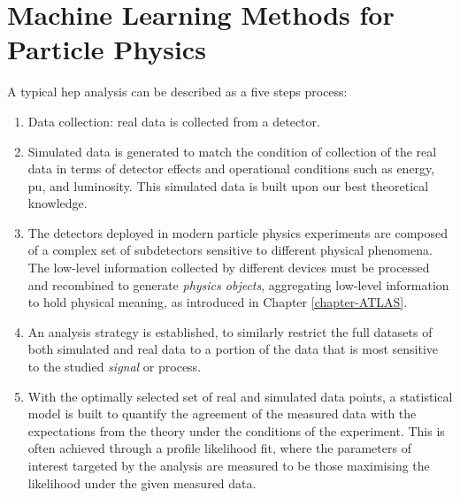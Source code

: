 \section{Machine Learning Methods for Particle Physics}
A typical \gls{hep} analysis can be described as a five steps process:
\begin{enumerate}
    \item Data collection: real data is collected from a detector. 
    \item Simulated data is generated to match the condition of collection of the real data in terms of detector effects and operational conditions such as energy, \gls{pu}, and luminosity. This simulated data is built upon our best theoretical knowledge. 
    \item The detectors deployed in modern particle physics experiments are composed of a complex set of subdetectors sensitive to different physical phenomena. The low-level information collected by different devices must be processed and recombined to generate \textit{physics objects}, aggregating low-level information to hold physical meaning, as introduced in Chapter \ref{chapter-ATLAS}.
    \item An analysis strategy is established, to similarly restrict the full datasets of both simulated and real data to a portion of the data that is most sensitive to the studied \textit{signal} or process.
    \item With the optimally selected set of real and simulated data points, a statistical model is built to quantify the agreement of the measured data with the expectations from the theory under the conditions of the experiment. This is often achieved through a profile likelihood fit, where the parameters of interest targeted by the analysis are measured to be those maximising the likelihood under the given measured data.
\end{enumerate}

